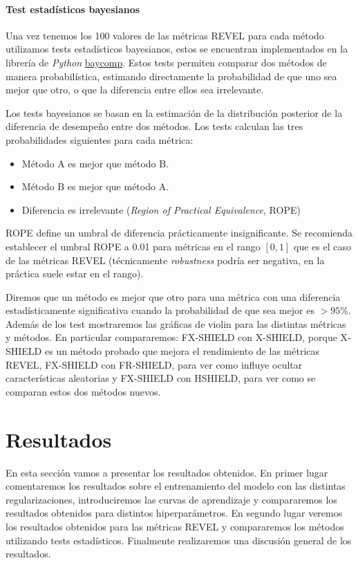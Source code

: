 \paragraph*{Test estadísticos bayesianos}

Una vez tenemos los 100 valores de las métricas REVEL para cada método utilizamos tests estadísticos bayesianos, estos se encuentran implementados en la librería de \textit{Python} \href{https://baycomp.readthedocs.io/en/latest/\#baycomp}{baycomp}. Estos tests permiten comparar dos métodos de manera probabilística, estimando directamente la probabilidad de que uno sea mejor que otro, o que la diferencia entre ellos sea irrelevante.

Los tests bayesianos se basan en la estimación de la distribución posterior de la diferencia de desempeño entre dos métodos. Los tests calculan las tres probabilidades siguientes para cada métrica:
\begin{itemize}

\item Método A es mejor que método B.
\item Método B es mejor que método A.
\item Diferencia es irrelevante (\textit{Region of Practical Equivalence}, ROPE)

\end{itemize}

ROPE define un umbral de diferencia prácticamente insignificante. Se recomienda establecer el umbral ROPE a 0.01 para métricas en el rango $[0,1]$ que es el caso de las métricas REVEL (técnicamente \textit{robustness} podría ser negativa, en la práctica suele estar en el rango).

Diremos que un método es mejor que otro para una métrica con una diferencia estadísticamente significativa cuando la probabilidad de que sea mejor es $>95\%$. Además de los test mostraremos las gráficas de violin para las distintas métricas y métodos. En particular compararemos: FX-SHIELD con X-SHIELD, porque X-SHIELD es un método probado que mejora el rendimiento de las métricas REVEL, FX-SHIELD con FR-SHIELD, para ver como influye ocultar características aleatorias y FX-SHIELD con HSHIELD, para ver como se comparan estos dos métodos nuevos.

\section{Resultados}

En esta sección vamos a presentar los resultados obtenidos. En primer lugar comentaremos los resultados sobre el entrenamiento del modelo con las distintas regularizaciones, introduciremos las curvas de aprendizaje y compararemos los resultados obtenidos para distintos hiperparámetros. En segundo lugar veremos los resultados obtenidos para las métricas REVEL y compararemos los métodos utilizando tests estadísticos. Finalmente realizaremos una discusión general de los resultados.

